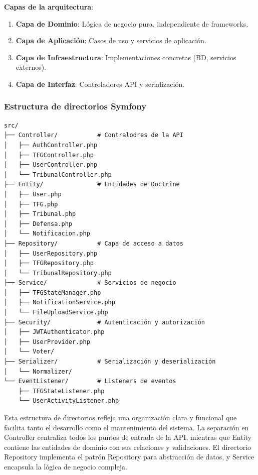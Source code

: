 \documentclass[12pt,a4paper,oneside]{report}
\providecommand{\tightlist}{%
  \setlength{\itemsep}{0pt}\setlength{\parskip}{0pt}}
\begin{document}
\textbf{Capas de la arquitectura}:

\begin{enumerate}
\def\labelenumi{\arabic{enumi}.}
\tightlist
\item
  \textbf{Capa de Dominio}: Lógica de negocio pura, independiente de
  frameworks.
\item
  \textbf{Capa de Aplicación}: Casos de uso y servicios de aplicación.
\item
  \textbf{Capa de Infraestructura}: Implementaciones concretas (BD,
  servicios externos).
\item
  \textbf{Capa de Interfaz}: Controladores API y serialización.
\end{enumerate}

\subsubsection{Estructura de directorios
Symfony}\label{estructura-de-directorios-symfony}

\begin{lstlisting}
src/
├── Controller/           # Contralodres de la API
│   ├── AuthController.php
│   ├── TFGController.php
│   ├── UserController.php
│   └── TribunalController.php
├── Entity/               # Entidades de Doctrine
│   ├── User.php
│   ├── TFG.php
│   ├── Tribunal.php
│   ├── Defensa.php
│   └── Notificacion.php
├── Repository/           # Capa de acceso a datos
│   ├── UserRepository.php
│   ├── TFGRepository.php
│   └── TribunalRepository.php
├── Service/              # Servicios de negocio
│   ├── TFGStateManager.php
│   ├── NotificationService.php
│   └── FileUploadService.php
├── Security/             # Autenticación y autorización
│   ├── JWTAuthenticator.php
│   ├── UserProvider.php
│   └── Voter/
├── Serializer/           # Serialización y deserialización
│   └── Normalizer/
└── EventListener/        # Listeners de eventos
    ├── TFGStateListener.php
    └── UserActivityListener.php
\end{lstlisting}

Esta estructura de directorios refleja una organización clara y funcional que facilita tanto el desarrollo como el mantenimiento del sistema. La separación en Controller centraliza todos los puntos de entrada de la API, mientras que Entity contiene las entidades de dominio con sus relaciones y validaciones. El directorio Repository implementa el patrón Repository para abstracción de datos, y Service encapsula la lógica de negocio compleja.
\end{document}
